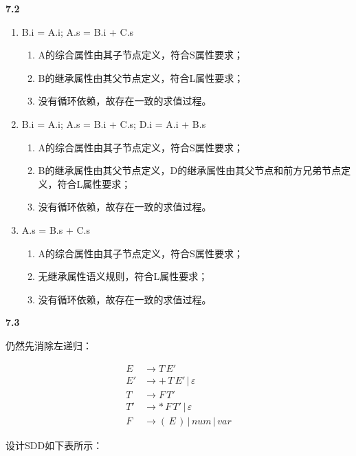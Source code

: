 \documentclass[UTF8]{report}
\newcommand{\tbf}[1]{\textbf{#1}}
\begin{document}
\noindent
\tbf{7.2}

\begin{enumerate}[label=(\arabic*)]
    \item B.i = A.i; A.s = B.i + C.s
    \begin{enumerate}
        \item A的综合属性由其子节点定义，符合S属性要求；
        \item B的继承属性由其父节点定义，符合L属性要求；
        \item 没有循环依赖，故存在一致的求值过程。
    \end{enumerate}
    \item B.i = A.i; A.s = B.i + C.s; D.i = A.i + B.s
    \begin{enumerate}
        \item A的综合属性由其子节点定义，符合S属性要求；
        \item B的继承属性由其父节点定义，D的继承属性由其父节点和前方兄弟节点定义，符合L属性要求；
        \item 没有循环依赖，故存在一致的求值过程。
    \end{enumerate}
    \item A.s = B.s + C.s
    \begin{enumerate}
        \item A的综合属性由其子节点定义，符合S属性要求；
        \item 无继承属性语义规则，符合L属性要求；
        \item 没有循环依赖，故存在一致的求值过程。
    \end{enumerate}
\end{enumerate}

\noindent
\tbf{7.3}

仍然先消除左递归：

\begin{align*}
    E &\to T \, E' \\
    E' &\to + \, T \, E' \, | \, \varepsilon \\
    T &\to F \, T' \\
    T' &\to * \, F \, T' \, | \, \varepsilon \\
    F &\to ( \, E \, ) \, | \, num \, | \, var
\end{align*}

设计SDD如下表所示：
\end{document}
